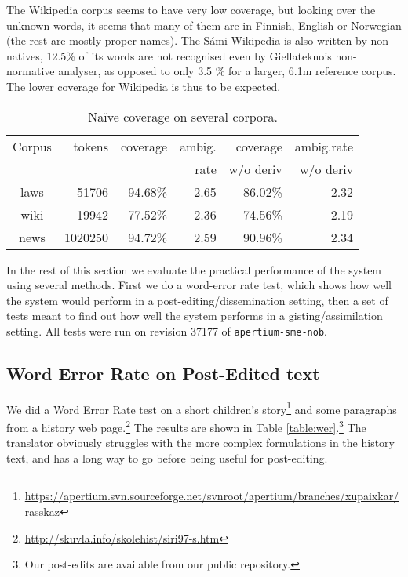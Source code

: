 \documentclass{book}
\begin{document}
The Wikipedia corpus seems to have very low coverage, but looking over
the unknown words, it seems that many of them are in Finnish, English
or Norwegian (the rest are mostly proper names). The S\'{a}mi Wikipedia
is also written by non-natives, 12.5\% of its words are not recognised
even by Giellatekno's non-normative analyser, as opposed to only 3.5 \% for
a larger, 6.1m reference corpus. The lower coverage for Wikipedia is thus to
be expected.


\begin{table}
  \begin{center}
  \begin{tabular}{crrrrr}
   Corpus     & tokens   & coverage & ambig.      & coverage   & ambig.rate  \\
              &          &          & rate        & w/o deriv  & w/o deriv \\
   laws       &  51706   & 94.68\%  & 2.65        & 86.02\%    & 2.32 \\
   wiki       & 19942    & 77.52\%  & 2.36        & 74.56\%    & 2.19 \\
   news       & 1020250  & 94.72\%  & 2.59        & 90.96\%    & 2.34 \\
  \end{tabular}
    \caption{Na\"{i}ve coverage on several corpora.}
    \label{table:cov}
  \end{center}
\end{table}
In the rest of this section we evaluate the practical performance of
the system using several methods. First we do a word-error rate test,
which shows how well the system would perform in a
post-editing/dissemination setting, then a set of tests meant to find
out how well the system performs in a gisting/assimilation setting.
All tests were run on revision 37177 of \texttt{apertium-sme-nob}.



\subsection{Word Error Rate on Post-Edited text}
\label{sec:WER}
We did a Word Error Rate test on a short children's
story\footnote{\href{https://apertium.svn.sourceforge.net/svnroot/apertium/branches/xupaixkar/rasskaz}{https://apertium.svn.sourceforge.net/svnroot/apertium/branches/xupaixkar/rasskaz}}
and some paragraphs from a history web
page.\footnote{\href{http://skuvla.info/skolehist/siri97-s.htm}{http://skuvla.info/skolehist/siri97-s.htm}}
The results are shown in Table \ref{table:wer}.\footnote{Our post-edits
  are available from our public repository.} The translator obviously
struggles with the more complex formulations in the history text, and
has a long way to go before being useful for post-editing.
\end{document}
